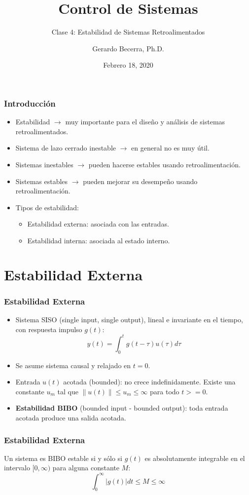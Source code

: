 \documentclass[aspectratio=169]{beamer}
\title{Control de Sistemas}
\subtitle{\small Clase 4: Estabilidad de Sistemas Retroalimentados}
\author{Gerardo Becerra, Ph.D.}
\institute{Pontificia Universidad Javeriana\\ Departamento de Electrónica}
\date{Febrero 18, 2020}
\newcommand{\norm}[1]{\left\lVert#1\right\rVert}
\theoremstyle{definition}
\theoremstyle{plain}
\theoremstyle{remark}
\begin{document}
\frame{\titlepage}	


\begin{frame}[<+->]\frametitle{Introducción}
\begin{itemize}
	\item Estabilidad $\rightarrow$ muy importante para el diseño y análisis de sistemas retroalimentados.
	\item Sistema de lazo cerrado inestable $\rightarrow$ en general no es muy útil.
	\item Sistemas inestables $\rightarrow$ pueden hacerse estables usando retroalimentación.
	\item Sistemas estables $\rightarrow$ pueden mejorar su desempeño usando retroalimentación.
	\item Tipos de estabilidad:
	\begin{itemize}
		\item Estabilidad externa: asociada con las entradas.
		\item Estabilidad interna: asociada al estado interno.
	\end{itemize}
\end{itemize}
\end{frame}

\section{Estabilidad Externa}
\begin{frame}[<+->]\frametitle{Estabilidad Externa}
\begin{itemize}
 	\item Sistema SISO (single input, single output), lineal e invariante en el tiempo, con respuesta impulso $g(t)$:
	\begin{equation*}
		y(t) = \int_0^t g(t-\tau) u(\tau) d\tau
	\end{equation*}
	\item Se asume sistema causal y relajado en $t=0$.
	\item Entrada $u(t)$ acotada (bounded): no crece indefinidamente. Existe una constante $u_m$ tal que $\norm{u(t)} \leq u_m \leq \infty$ para todo $t >= 0$.
  \item \textbf{Estabilidad BIBO} (bounded input - bounded output): toda entrada acotada produce una salida acotada.
 \end{itemize} 
\end{frame}

\begin{frame}[<-+>]\frametitle{Estabilidad Externa}
  \begin{theorem}\label{th:externalStability1}
  Un sistema es BIBO estable si y sólo si $g(t)$ es absolutamente integrable en el intervalo $[0,\infty)$ para alguna constante $M$:
  \begin{equation*}
  	\int_0^\infty |g(t)| dt \leq M \leq \infty
  \end{equation*}
  \end{theorem}
\end{frame}
\end{document}
